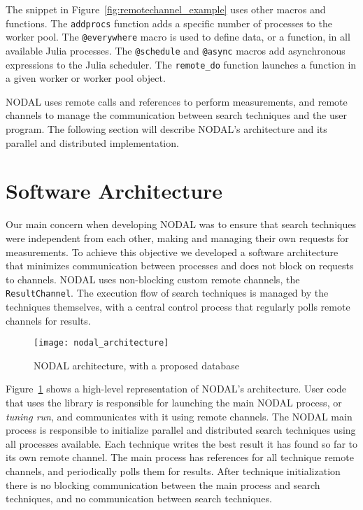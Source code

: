 The snippet in Figure~\ref{fig:remotechannel_example} uses other macros and
functions. The \texttt{addprocs} function adds a specific number of processes
to the worker pool. The \texttt{@everywhere} macro is used to define data, or a
function, in all available Julia processes. The \texttt{@schedule} and
\texttt{@async} macros add asynchronous expressions to the Julia scheduler.
The \texttt{remote\_do} function launches a function in a given worker or
worker pool object.

NODAL uses remote calls and references to perform measurements, and remote
channels to manage the communication between search techniques and the user
program. The following section will describe NODAL's architecture and its
parallel and distributed implementation.

\section{Software Architecture}
\label{sec:nodal-arch}

Our main concern when developing NODAL was to ensure that search techniques
were independent from each other, making and managing their own requests for
measurements. To achieve this objective we developed a software architecture
that minimizes communication between processes and does not block on requests
to channels. NODAL uses non-blocking custom remote channels, the
\texttt{ResultChannel}.  The execution flow of search techniques is managed by
the techniques themselves, with a central control process that regularly polls
remote channels for results.

\begin{figure}[htpb]
    \centering
    \texttt{[image: nodal\_architecture]}
    \caption{NODAL architecture, with a proposed database}
    \label{fig:nodal_architecture}
\end{figure}

Figure~\ref{fig:nodal_architecture} shows a high-level representation of
NODAL's architecture. User code that uses the library is responsible for
launching the main NODAL process, or \textit{tuning run}, and communicates with
it using remote channels. The NODAL main process is responsible to initialize
parallel and distributed search techniques using all processes available. Each
technique writes the best result it has found so far to its own remote channel.
The main process has references for all technique remote channels, and
periodically polls them for results.  After technique initialization there is
no blocking communication between the main process and search techniques, and
no communication between search techniques.

